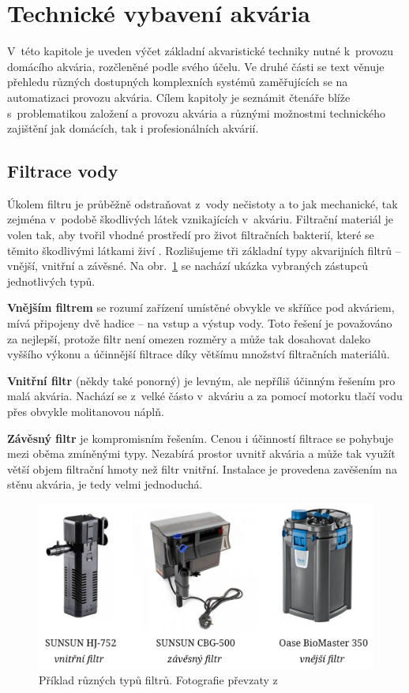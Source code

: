 \section{Technické vybavení akvária}
    V~této kapitole je uveden výčet základní akvaristické techniky nutné k~provozu domácího akvária, rozčleněné podle svého účelu. Ve druhé části se text věnuje přehledu různých dostupných komplexních systémů zaměřujících se na automatizaci provozu akvária. Cílem kapitoly je seznámit čtenáře blíže s~problematikou založení a provozu akvária a různými možnostmi technického zajištění jak domácích, tak i profesionálních akvárií.
    \subsection{Filtrace vody}
        Úkolem filtru je průběžně odstraňovat z~vody nečistoty a to jak mechanické, tak zejména v~podobě škodlivých látek vznikajících v~akváriu. Filtrační materiál je volen tak, aby tvořil vhodné prostředí pro život filtračních bakterií, které se těmito škodlivými látkami živí \cite{yt-filtrace}. Rozlišujeme tři základní typy akvarijních filtrů -- vnější, vnitřní a závěsné. Na obr.~\ref{fig:filtry-srovnani} se nachází ukázka vybraných zástupců jednotlivých typů.
        
        \textbf{Vnějším filtrem} se rozumí zařízení umístěné obvykle ve skříňce pod akváriem, mívá připojeny dvě hadice -- na vstup a výstup vody. Toto řešení je považováno za nejlepší, protože filtr není omezen rozměry a může tak dosahovat daleko vyššího výkonu a účinnější filtrace díky většímu množství filtračních materiálů. 

        \textbf{Vnitřní filtr} (někdy také ponorný) je levným, ale nepříliš účinným řešením pro malá akvária. Nachází se z~velké částo v~akváriu a za pomocí motorku tlačí vodu přes obvykle molitanovou náplň.

        \textbf{Závěsný filtr}  je kompromisním řešením.  Cenou i účinností filtrace se pohybuje mezi oběma zmíněnými typy. Nezabírá prostor uvnitř akvária a může tak využít větší objem filtrační hmoty než filtr vnitřní. Instalace je provedena zavěšením na stěnu akvária, je tedy velmi jednoduchá. 

        \begin{figure}[h!]
            \centering
            \includegraphics[width=\textwidth]{obrazky/filtry/filtry.jpg}
            \caption{Příklad různých typů filtrů. Fotografie převzaty z~\cite{eshop-rostlinna-akvaria}}
            \label{fig:filtry-srovnani}
        \end{figure}

